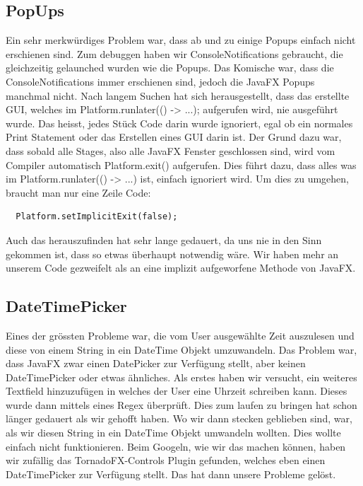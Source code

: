 \documentclass[11pt,titelpage]{scrartcl}
\begin{document}
\subsection{PopUps}
Ein sehr merkwürdiges Problem war, dass ab und zu einige Popups einfach nicht erschienen sind. Zum debuggen haben wir ConsoleNotifications gebraucht, die gleichzeitig
gelaunched wurden wie die Popups. Das Komische war, dass die ConsoleNotifications immer erschienen sind, jedoch die JavaFX Popups manchmal nicht. Nach langem Suchen hat sich
herausgestellt, dass das erstellte GUI, welches im Platform.runlater(() -> {...}); aufgerufen wird, nie ausgeführt wurde. Das heisst, jedes Stück Code darin wurde ignoriert,
egal ob ein normales Print Statement oder das Erstellen eines GUI darin ist. Der Grund dazu war, dass sobald alle Stages, also alle JavaFX Fenster geschlossen sind, wird vom Compiler automatisch
Platform.exit() aufgerufen. Dies führt dazu, dass alles was im Platform.runlater(() -> {...}) ist, einfach ignoriert wird. Um dies zu umgehen, braucht man nur eine Zeile Code:
\begin{lstlisting}
  Platform.setImplicitExit(false);
\end{lstlisting}
Auch das herauszufinden hat sehr lange gedauert, da uns nie in den Sinn gekommen ist, dass so etwas überhaupt notwendig wäre. Wir haben mehr an unserem Code gezweifelt als an eine implizit aufgeworfene Methode von JavaFX.
\subsection{DateTimePicker}
Eines der grössten Probleme war, die vom User ausgewählte Zeit auszulesen und diese von einem String in ein DateTime Objekt umzuwandeln. Das Problem war, dass JavaFX zwar einen
DatePicker zur Verfügung stellt, aber keinen DateTimePicker oder etwas ähnliches. Als erstes haben wir versucht, ein weiteres Textfield hinzuzufügen in welches der User eine
Uhrzeit schreiben kann. Dieses wurde dann mittels eines Regex überprüft. Dies zum laufen zu bringen hat schon länger gedauert als wir gehofft haben. Wo wir dann stecken geblieben sind,
war, als wir diesen String in ein DateTime Objekt umwandeln wollten. Dies wollte einfach nicht funktionieren. Beim Googeln, wie wir das machen können, haben wir zufällig das
TornadoFX-Controls Plugin gefunden, welches eben einen DateTimePicker zur Verfügung stellt. Das hat dann unsere Probleme gelöst.
\end{document}

